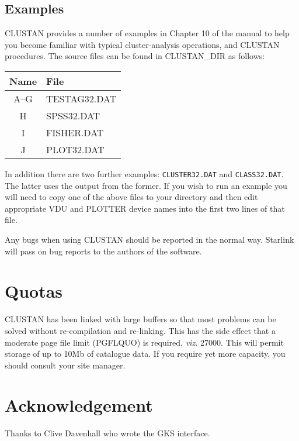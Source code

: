 \subsection{Examples}
{\small CLUSTAN} provides a number of examples in Chapter 10 of the manual to
help you become familiar with typical cluster-analysis operations,
and {\small CLUSTAN} procedures.
The source files can be found in CLUSTAN\_DIR as follows:
\begin{center}
\begin{tabular}{|c|l|}
\hline
Name & File \\ \hline
A--G & TESTAG32.DAT \\
H & SPSS32.DAT \\
I & FISHER.DAT \\
J & PLOT32.DAT \\ \hline
\end{tabular}
\end{center}
In addition there are two further examples: {\tt CLUSTER32.DAT} and
{\tt CLASS32.DAT}.  The latter uses the output from the former.
If you wish to run an example you will need to copy one of the above
files to your directory and then edit appropriate VDU and PLOTTER device
names into the first two lines of that file.

Any bugs when using {\small CLUSTAN} should be reported in the normal way.
Starlink will pass on bug reports to the authors of the software.

\section{Quotas} {\small CLUSTAN} has been linked with large buffers so
that most problems can be solved without re-compilation and re-linking.
This has the side effect that a moderate page file limit (PGFLQUO) is
required, {\it viz.} 27000.  This will permit storage of up to 10Mb of
catalogue data.  If you require yet more capacity, you should consult
your site manager.

\section{Acknowledgement}
Thanks to Clive Davenhall who wrote the GKS interface.
